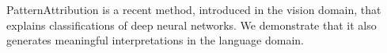 PatternAttribution is a recent method, introduced in the vision domain, that explains classifications of deep neural networks. We demonstrate that it also generates meaningful interpretations in the language domain.
